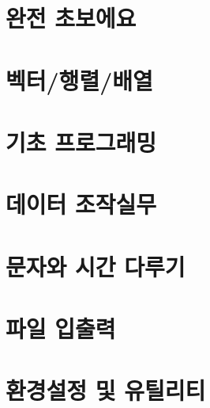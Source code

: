 %
%
%
%
%
%



\chapter{완전 초보에요}


\chapter{벡터/행렬/배열}


\chapter{기초 프로그래밍}


\chapter{데이터 조작실무}


\chapter{문자와 시간 다루기}


\chapter{파일 입출력}


\chapter{환경설정 및 유틸리티}

